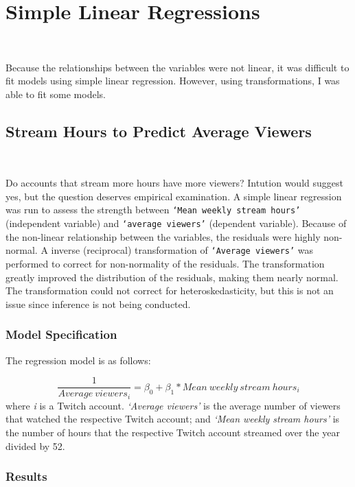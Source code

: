 \documentclass[12pt]{article}
\begin{document}
\section{Simple Linear Regressions}\

Because the relationships between the variables were not linear, it was difficult to fit models using simple linear regression. However, using transformations, I was able to fit some models.

\subsection{Stream Hours to Predict Average Viewers}\

Do accounts that stream more hours have more viewers? Intution would suggest yes, but the question deserves empirical examination. A simple linear regression was run to assess the strength between \texttt{`Mean weekly stream hours’} (independent variable) and \texttt{`average viewers’} (dependent variable). Because of the non-linear relationship between the variables, the residuals were highly non-normal. A inverse (reciprocal) transformation of \texttt{`Average viewers’} was performed to correct for non-normality of the residuals. The transformation greatly improved the distribution of the residuals, making them nearly normal. The transformation could not correct for heteroskedasticity, but this is not an issue since inference is not being conducted.

\subsubsection{Model Specification}

The regression model is as follows:

\begin{equation}
\dfrac{1}{Average\ viewers_{i}} = \beta_{0} + \beta_{1} \ast Mean\ weekly\ stream\ hours_{i} 
\end{equation}
where \textit{i} is a Twitch account. \textit{`Average viewers'} is the average number of viewers that watched the respective Twitch account; and \textit{`Mean weekly stream hours'} is the number of hours that the respective Twitch account streamed over the year divided by 52.

\subsubsection{Results}\

\end{document}
